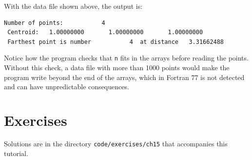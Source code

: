 With the data file shown above, the output is:

\begin{lstlisting}[style=output]
 Number of points:           4
 Centroid:   1.00000000       1.00000000       1.00000000
 Farthest point is number           4  at distance   3.31662488
\end{lstlisting}

Notice how the program checks that \texttt{n} fits in the arrays before reading the points. Without this check, a data file with more than 1000 points would make the program write beyond the end of the arrays, which in Fortran 77 is not detected and can have unpredictable consequences.

\section{Exercises}

Solutions are in the directory \texttt{code/exercises/ch15} that accompanies this tutorial.

